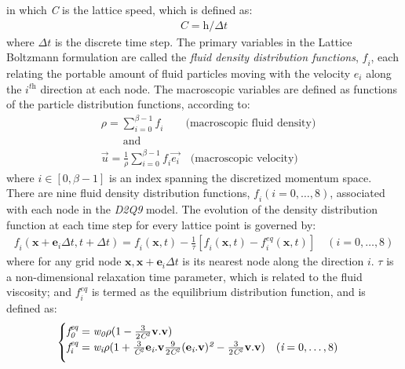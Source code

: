 in which \textit{C} is the lattice speed, which is defined as:
\begin{align}
\textit{C}=\textit{h}/\Delta t
\end{align}
where $\Delta \textit{t}$ is the discrete time step. The primary variables in the Lattice Boltzmann formulation are called the \textit{fluid density distribution functions}, $\textit{f}_{\textit{i}}$, each relating the portable amount of fluid particles moving with the velocity $\textit{e}_{\textit{i}}$ along the $\textit{i}^{\textit{th}}$ direction at each node. The macroscopic variables are defined as functions of the particle distribution functions, according to:
\begin{align} 
 \nonumber
& \rho=\sum\limits_{\textit{i}=0}^{\beta - 1}{\textit{f}_{\textit{i}}} \qquad \mbox{(macroscopic fluid density)} \\ 
 \nonumber
& \qquad \mbox{and} \\ 
& \overrightarrow{\textit{u}}=\frac{1}{\rho} \sum\limits_{\textit{i}=0}^{\beta -1}{\textit{f}_{\textit{i}}\overrightarrow{\textit{e}_{\textit{i}}}} \quad \mbox{(macroscopic velocity)}
\end{align} 
where $\textit{i} \in [0, \beta -1]$ is an index spanning the discretized momentum space. There are nine fluid density distribution functions, $\textit{f}_{\textit{i}}(\textit{i}=0,\dots,8)$, associated with each node in the \textit{D2Q9} model. The evolution of the density distribution function at each time step for every lattice point is governed by:
\begin{align} 
\label{eq:stream}
\textit{f}_{\textit{i}}(\textbf{x}+\textbf{e}_{\textit{i}} \Delta t, t + \Delta t) = \textit{f}_{\textit{i}}(\textbf{x},t) - \frac{1}{\tau} [\textit{f}_{\textit{i}}(\textbf{x},t) -\textit{f}_{\textit{i}}^{\textit{eq}}(\textbf{x},t)] \quad (\textit{i}=0,\dots,8)
\end{align}
where for any grid node $\textbf{x},\textbf{x}+\textbf{e}_{\textit{i}} \Delta t$ is its nearest node along the direction $\textit{i}$. $\tau$ is a non-dimensional relaxation time parameter, which is related to the fluid viscosity; and $\textit{f}_{\textit{i}}^{\textit{eq}}$ is termed as the equilibrium distribution function, and is defined as:
\begin{align}
\begin{cases}
\textit{f}_{\textit{0}}^{\textit{eq}}=\textit{w}_{\textit{0}} \rho (1 - \frac{3}{2\textit{C}^{\textit{2}}}\textbf{v}.\textbf{v}) \\ 
\vspace*{2mm}
\textit{f}_{\textit{i}}^{\textit{eq}}=\textit{w}_{\textit{i}} \rho (1 + \frac{3}{\textit{C}^{\textit{2}}}\textbf{e}_{\textit{i}}.\textbf{v} \frac{9}{2\textit{C}^{\textit{2}}} (\textbf{e}_{\textit{i}}.\textbf{v})^{\textit{2}}-\frac{3}{2 \textit{C}^{\textit{2}}}\textbf{v}.\textbf{v}) \quad (\textit{i}=0,\dots,8)
\end{cases}
\end{align}

